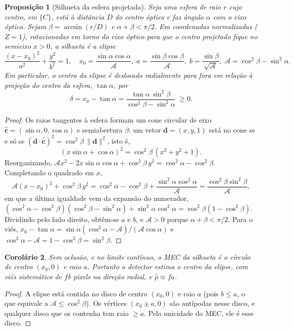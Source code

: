 \documentclass[11pt,a4paper]{article}
\newtheorem{proposicao}{Proposição}
\newtheorem{corolario}[proposicao]{Corolário}
\theoremstyle{definition}
\theoremstyle{remark}
\newcommand{\vect}[1]{\bm{#1}}
\begin{document}
\begin{proposicao}[Silhueta da esfera projetada]
\label{prop:elipse}
Seja uma esfera de raio $r$ cujo centro, em $\{C\}$, está à distância $D$
do centro óptico e faz ângulo $\alpha$ com o eixo óptico. Sejam
$\beta=\arcsin(r/D)$ e $\alpha+\beta<\pi/2$. Em coordenadas normalizadas
($Z=1$), rotacionadas em torno do eixo óptico para que o centro projetado fique
no semieixo $x>0$, a silhueta é a elipse
\begin{equation}
\frac{(x-x_0)^2}{a^2}+\frac{y^2}{b^2}=1,\quad
x_0=\frac{\sin\alpha\cos\alpha}{\mathcal A},\;
a=\frac{\sin\beta\cos\beta}{\mathcal A},\;
b=\frac{\sin\beta}{\sqrt{\mathcal A}},\;
\mathcal A=\cos^2\beta-\sin^2\alpha.
\end{equation}
Em particular, o centro da elipse é deslocado radialmente para fora em
relação à projeção do centro da esfera, $\tan\alpha$, por
\begin{equation}
\delta = x_0-\tan\alpha = \frac{\tan\alpha\,\sin^2\beta}{\cos^2\beta-\sin^2\alpha}\;\geq0.
\label{eq:bias}
\end{equation}
\end{proposicao}
\begin{proof}
Os raios tangentes à esfera formam um cone circular de eixo
$\hat{\vect c}=(\sin\alpha,0,\cos\alpha)$ e semiabertura $\beta$: um vetor
$\vect d=(x,y,1)$ está no cone se e só se
$(\vect d\cdot\hat{\vect c})^2=\cos^2\beta\,\|\vect d\|^2$, isto é,
\[
(x\sin\alpha+\cos\alpha)^2=\cos^2\beta\,(x^2+y^2+1).
\]
Reorganizando, $\mathcal A x^2-2x\sin\alpha\cos\alpha+\cos^2\beta\,y^2=
\cos^2\alpha-\cos^2\beta$. Completando o quadrado em $x$,
\[
\mathcal A(x-x_0)^2+\cos^2\beta\,y^2=\cos^2\alpha-\cos^2\beta+\frac{\sin^2\alpha\cos^2\alpha}{\mathcal A}
=\frac{\cos^2\beta\sin^2\beta}{\mathcal A},
\]
em que a última igualdade vem da expansão do numerador,
$(\cos^2\alpha-\cos^2\beta)(\cos^2\beta-\sin^2\alpha)+\sin^2\alpha\cos^2\alpha
=\cos^2\beta(1-\cos^2\beta)$. Dividindo pelo lado direito, obtêm-se $a$ e $b$,
e $\mathcal A>0$ porque $\alpha+\beta<\pi/2$. Para o viés,
$x_0-\tan\alpha=\sin\alpha(\cos^2\alpha-\mathcal A)/(\mathcal A\cos\alpha)$ e
$\cos^2\alpha-\mathcal A=1-\cos^2\beta=\sin^2\beta$.
\end{proof}

\begin{corolario}
\label{cor:mec-elipse}
Sem oclusão, e no limite contínuo, o MEC da silhueta é o círculo de centro
$(x_0,0)$ e raio $a$. Portanto o detector estima o centro da \emph{elipse}, com
viés sistemático de $f\delta$ pixels na direção radial, e $\hat\rho\approx fa$.
\end{corolario}
\begin{proof}
A elipse está contida no disco de centro $(x_0,0)$ e raio $a$ (pois $b\leq a$,
o que equivale a $\mathcal A\leq\cos^2\beta$). Os vértices $(x_0\pm a,0)$ são
antípodas nesse disco, e qualquer disco que os contenha tem raio $\geq a$.
Pela unicidade do MEC, ele é esse disco.
\end{proof}
\end{document}
